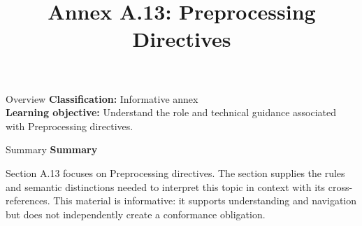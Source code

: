 \documentclass[10pt,letterpaper]{article}
\title{Annex A.13: Preprocessing Directives}
\author{}
\date{}
\begin{document}
\maketitle
\begin{CornellOverviewBox}{Overview}
\textbf{Classification:} Informative annex\\[2pt]
\textbf{Learning objective:} Understand the role and technical guidance associated with Preprocessing directives.
\end{CornellOverviewBox}\begin{CornellSummaryBox}{Summary}
{\sffamily\bfseries\color{Accent} Summary}\par\vspace{3pt}Section A.13 focuses on Preprocessing directives. The section supplies the rules and semantic distinctions needed to interpret this topic in context with its cross-references. This material is informative: it supports understanding and navigation but does not independently create a conformance obligation.
\end{CornellSummaryBox}
\end{document}
